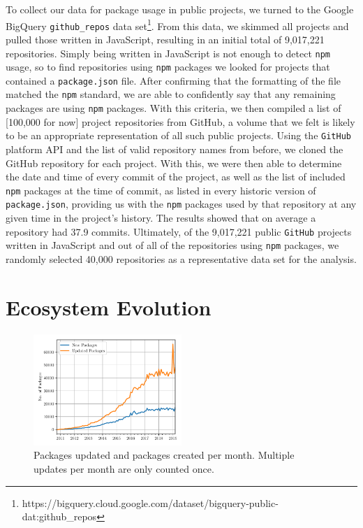 \documentclass[10pt,conference]{IEEEtran}
\def\code#1{\texttt{#1}}
\begin{document}
To collect our data for package usage in public projects, 
we turned to the Google BigQuery \code{github\_repos} data 
set\footnote{https://bigquery.cloud.google.com/dataset/bigquery-public-dat:github\_repos}.
From this data, we skimmed all projects and pulled those 
written in JavaScript, resulting in an initial total of 9,017,221 
repositories. Simply being written in JavaScript is not enough to detect
\code{npm} usage, so to find repositories using \code{npm} packages
we looked for projects that contained a \code{package.json} 
file. After confirming that the formatting of the file matched the \code{npm}
standard, we are able to confidently say that any remaining packages are 
using \code{npm} packages. With this criteria, we then compiled a list 
of [100,000 for now] project 
repositories from GitHub, a volume that we felt is likely to be an 
appropriate representation of all such public projects.
Using the \code{GitHub} platform API and the list of valid repository names 
from before, we cloned the GitHub repository for each project. With
this, we were then able to determine the date and time of every 
commit of the project, as well as the list of included \code{npm} packages
at the time of commit, as listed in every historic version of 
\code{package.json}, providing us with the \code{npm} packages used by that repository
at any given time in the project's history. The results showed that on average a repository 
had 37.9 commits. Ultimately, of the 9,017,221 
public \code{GitHub} projects written in JavaScript and out of all of the repositories
using \code{npm} packages, we randomly selected 40,000 repositories as
a representative data set for the analysis.


\section{Ecosystem Evolution}

\begin{figure}
  \includegraphics[width=0.5\textwidth]{figures/new_vs_updates_by_month.pdf}
  \caption{Packages updated and packages created per month. Multiple updates per month are
  only counted once.}
  \label{npmGrowth}
\end{figure}
\end{document}

